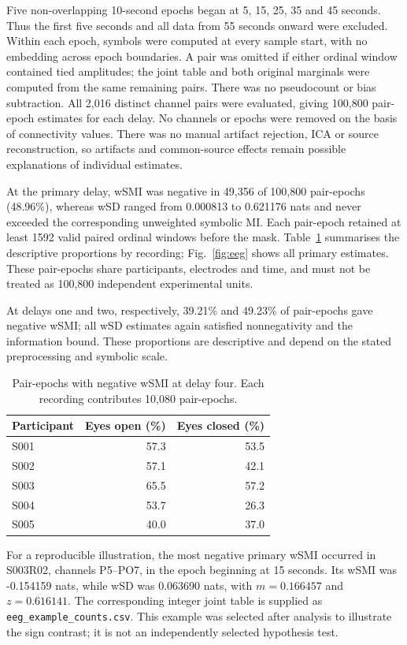 Five non-overlapping 10-second epochs began at 5, 15, 25, 35 and 45 seconds. Thus the first five seconds and all data from 55 seconds onward were excluded. Within each epoch, symbols were computed at every sample start, with no embedding across epoch boundaries. A pair was omitted if either ordinal window contained tied amplitudes; the joint table and both original marginals were computed from the same remaining pairs. There was no pseudocount or bias subtraction. All 2,016 distinct channel pairs were evaluated, giving 100,800 pair-epoch estimates for each delay. No channels or epochs were removed on the basis of connectivity values. There was no manual artifact rejection, ICA or source reconstruction, so artifacts and common-source effects remain possible explanations of individual estimates.

At the primary delay, wSMI was negative in 49,356 of 100,800 pair-epochs (48.96\%), whereas wSD ranged from 0.000813 to 0.621176 nats and never exceeded the corresponding unweighted symbolic MI. Each pair-epoch retained at least 1592 valid paired ordinal windows before the mask. Table~\ref{tab:negative} summarises the descriptive proportions by recording; Fig.~\ref{fig:eeg} shows all primary estimates. These pair-epochs share participants, electrodes and time, and must not be treated as 100,800 independent experimental units.

At delays one and two, respectively, 39.21\% and 49.23\% of pair-epochs gave negative wSMI; all wSD estimates again satisfied nonnegativity and the information bound. These proportions are descriptive and depend on the stated preprocessing and symbolic scale.

\begin{table}[t]
\additioncolor
\caption{Pair-epochs with negative wSMI at delay four. Each recording contributes 10,080 pair-epochs.}
\label{tab:negative}
\centering
\begin{tabular}{lrr}
\toprule
Participant & Eyes open (\%) & Eyes closed (\%)\\
\midrule
S001 & 57.3 & 53.5 \\
S002 & 57.1 & 42.1 \\
S003 & 65.5 & 57.2 \\
S004 & 53.7 & 26.3 \\
S005 & 40.0 & 37.0 \\
\bottomrule
\end{tabular}
\end{table}

For a reproducible illustration, the most negative primary wSMI occurred in S003R02, channels P5--PO7, in the epoch beginning at 15 seconds. Its wSMI was -0.154159 nats, while wSD was 0.063690 nats, with $m=0.166457$ and $z=0.616141$. The corresponding integer joint table is supplied as \texttt{eeg\_example\_counts.csv}. This example was selected after analysis to illustrate the sign contrast; it is not an independently selected hypothesis test.


